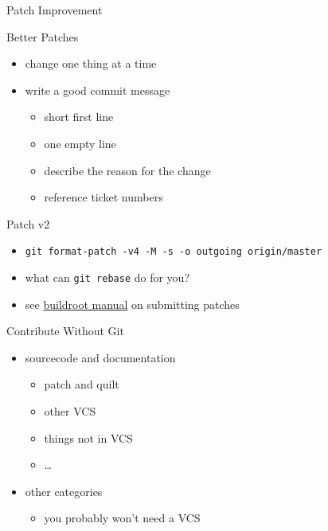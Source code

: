 \documentclass{beamer}
\begin{document}
\begin{frame}{Patch Improvement}
    \begin{block}{Better Patches}
        \begin{itemize}
            \item change one thing at a time
            \item write a good commit message
            \begin{itemize}
                \item short first line
                \item one empty line
                \item describe the reason for the change
                \item reference ticket numbers
            \end{itemize}
        \end{itemize}
    \end{block}
    \pause
    \begin{block}{Patch v2}
        \begin{itemize}
            \item \small\texttt{git format-patch -v4 -M -s -o outgoing origin/master}\normalsize
            \item what can \texttt{git rebase} do for you?
            \item see \href{https://buildroot.uclibc.org/downloads/manual/manual.html\#submitting-patches}{buildroot manual}
                    on submitting patches
        \end{itemize}
    \end{block}
\end{frame}

\begin{frame}{Contribute Without Git}
    \begin{itemize}
        \item sourcecode and documentation
        \begin{itemize}
            \item patch and quilt
            \item other VCS
            \item things not in VCS
            \item \dots
        \end{itemize}
        \item other categories
        \begin{itemize}
            \item you probably won't need a VCS
        \end{itemize}
    \end{itemize}
\end{frame}
\end{document}
